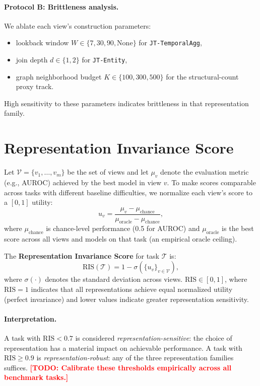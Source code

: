 \documentclass[11pt]{article}
\newcommand{\todo}[1]{\textcolor{red}{\textbf{[TODO: #1]}}}
\newcommand{\RIS}{\mathrm{RIS}}
\newcommand{\viewname}[1]{\texttt{#1}}
\begin{document}
\paragraph{Protocol B: Brittleness analysis.}
We ablate each view's construction parameters:
\begin{itemize}
  \item lookback window $W \in \{7, 30, 90, \mathrm{None}\}$ for
        \viewname{JT-TemporalAgg},
  \item join depth $d \in \{1, 2\}$ for \viewname{JT-Entity},
  \item graph neighborhood budget $K \in \{100, 300, 500\}$ for the
        structural-count proxy track.
\end{itemize}
High sensitivity to these parameters indicates brittleness in that
representation family.

\section{Representation Invariance Score}
\label{sec:ris}

Let $\mathcal{V} = \{v_1, \ldots, v_m\}$ be the set of views and let
$\mu_v$ denote the evaluation metric (e.g., AUROC) achieved by the
best model in view $v$.
To make scores comparable across tasks with different baseline
difficulties, we normalize each view's score to a $[0,1]$ utility:
\[
  u_v = \frac{\mu_v - \mu_{\text{chance}}}{\mu_{\text{oracle}} - \mu_{\text{chance}}},
\]
where $\mu_{\text{chance}}$ is chance-level performance (0.5 for AUROC)
and $\mu_{\text{oracle}}$ is the best score across all views and models
on that task (an empirical oracle ceiling).

The \textbf{Representation Invariance Score} for task $\mathcal{T}$ is:
\[
  \RIS(\mathcal{T}) = 1 - \sigma(\{u_v\}_{v \in \mathcal{V}}),
\]
where $\sigma(\cdot)$ denotes the standard deviation across views.
$\RIS \in [0, 1]$, where $\RIS = 1$ indicates that all representations
achieve equal normalized utility (perfect invariance) and lower values
indicate greater representation sensitivity.

\paragraph{Interpretation.}
A task with $\RIS < 0.7$ is considered \emph{representation-sensitive}:
the choice of representation has a material impact on achievable
performance.
A task with $\RIS \ge 0.9$ is \emph{representation-robust}: any of the
three representation families suffices.
\todo{Calibrate these thresholds empirically across all benchmark
tasks.}
\end{document}
